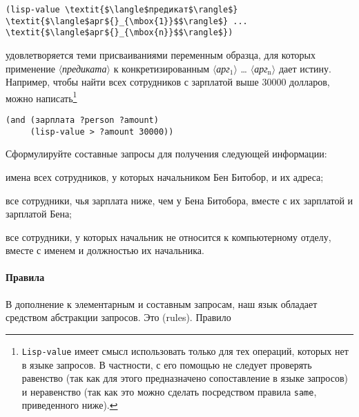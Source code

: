 \begin{Verbatim}[fontsize=\small]
(lisp-value \textit{$\langle$предикат$\rangle$} \textit{$\langle$арг${}_{\mbox{1}}$$\rangle$} ... \textit{$\langle$арг${}_{\mbox{n}}$$\rangle$})
\end{Verbatim}
удовлетворяется теми присваиваниями переменным образца, для которых
применение \textit{$\langle$предиката$\rangle$} к конкретизированным
\textit{$\langle$арг${}_{\mbox{1}}$$\rangle$} \ldots
\textit{$\langle$арг${}_{\mbox{n}}$$\rangle$} дает истину.  Например, чтобы найти
всех сотрудников с зарплатой выше 30000 долларов, можно
написать\footnote{{\tt Lisp-value} имеет смысл использовать только для
тех операций, которых нет в языке запросов. В частности, с его
помощью не следует проверять равенство (так как для этого
предназначено сопоставление в языке запросов) и неравенство (так как
это можно сделать посредством правила {\tt same}, приведенного ниже).}

\begin{Verbatim}[fontsize=\small]
(and (зарплата ?person ?amount)
     (lisp-value > ?amount 30000))
\end{Verbatim}

\begin{exercise}{4.56}%
\label{EX4.56}%
Сформулируйте составные запросы для получения следующей
информации:

\begin{plainenum}
\item

имена всех сотрудников, у которых начальником Бен
Битобор, и их адреса;

\item
все сотрудники, чья зарплата ниже, чем у Бена
Битобора, вместе с их зарплатой и зарплатой Бена;

\item
все сотрудники, у которых начальник не относится к
компьютерному отделу, вместе с именем и должностью их начальника.
\end{plainenum}
\end{exercise}

\paragraph{Правила}

В дополнение к элементарным и 
составным запросам, наш 
язык обладает  средством 
абстракции запросов. Это 
 (rules).  Правило

